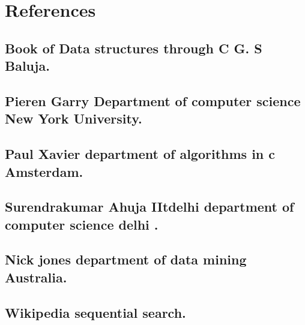 \documentclass{article}
\begin{document}
\section*{References}
\subsection{ Book of Data structures through C G. S Baluja.}
\subsection{ Pieren Garry Department of computer science 
New York University.}
\subsection{ Paul Xavier department of algorithms in c 
Amsterdam.}
\subsection{ Surendrakumar Ahuja IItdelhi department of 
computer science delhi .}
\subsection{ Nick jones department of data mining Australia.}
\subsection{ Wikipedia sequential search.}
\end{document}
